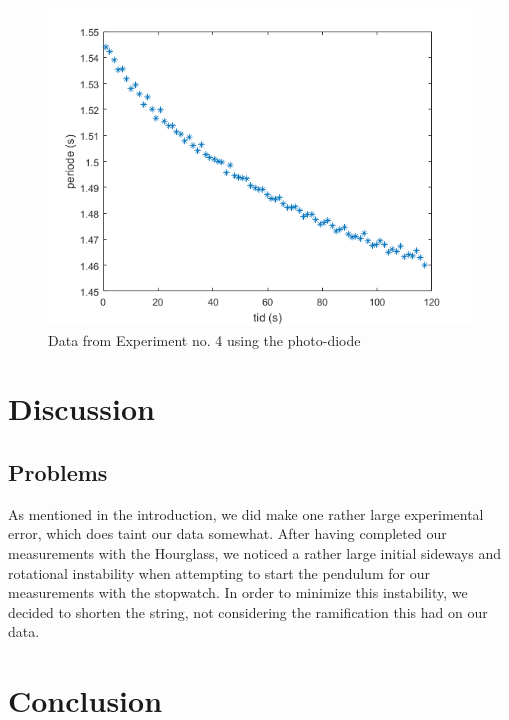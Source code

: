 \documentclass[%
 reprint,
 amsmath,amssymb,
 aps,
]{revtex4-1}
\begin{document}
    \begin{figure}[h!]
    	\center
    	\includegraphics[scale=0.6]{forsok4fig1}
    	\caption{Data from Experiment no. 4 using the photo-diode}
        \label{fig:data4}
    \end{figure}

\section{Discussion}
    \subsection{\label{disc_problems}Problems}
        As mentioned in the introduction, we did make one rather large experimental error, which does taint our data somewhat. After having completed our measurements with the Hourglass, we noticed a rather large initial sideways and rotational instability when attempting to start the pendulum for our measurements with the stopwatch. In order to minimize this instability, we decided to shorten the string, not considering the ramification this had on our data.

 
\section{Conclusion}
	


\end{document}
